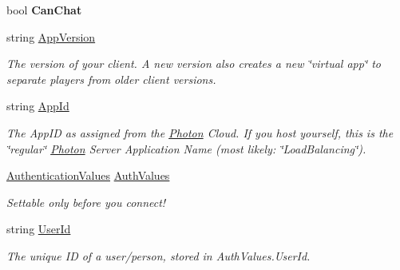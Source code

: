 \begin{DoxyCompactItemize}
\item 
bool {\bfseries Can\+Chat}\hypertarget{class_exit_games_1_1_client_1_1_photon_1_1_chat_1_1_chat_client_a71c10e565150962413bb1abaa89af66a}{}\label{class_exit_games_1_1_client_1_1_photon_1_1_chat_1_1_chat_client_a71c10e565150962413bb1abaa89af66a}

\item 
string \hyperlink{class_exit_games_1_1_client_1_1_photon_1_1_chat_1_1_chat_client_a96bec51384215e8622397b8fe2fc90e1}{App\+Version}
\begin{DoxyCompactList}\small\item\em The version of your client. A new version also creates a new \char`\"{}virtual app\char`\"{} to separate players from older client versions.\end{DoxyCompactList}\item 
string \hyperlink{class_exit_games_1_1_client_1_1_photon_1_1_chat_1_1_chat_client_a876c9a53400fe18fc365775ca728928f}{App\+Id}
\begin{DoxyCompactList}\small\item\em The App\+ID as assigned from the \hyperlink{namespace_exit_games_1_1_client_1_1_photon}{Photon} Cloud. If you host yourself, this is the \char`\"{}regular\char`\"{} \hyperlink{namespace_exit_games_1_1_client_1_1_photon}{Photon} Server Application Name (most likely\+: \char`\"{}\+Load\+Balancing\char`\"{}).\end{DoxyCompactList}\item 
\hyperlink{class_exit_games_1_1_client_1_1_photon_1_1_chat_1_1_authentication_values}{Authentication\+Values} \hyperlink{class_exit_games_1_1_client_1_1_photon_1_1_chat_1_1_chat_client_a5c03b22e8271f95ee0b46ebbd2bac651}{Auth\+Values}
\begin{DoxyCompactList}\small\item\em Settable only before you connect!\end{DoxyCompactList}\item 
string \hyperlink{class_exit_games_1_1_client_1_1_photon_1_1_chat_1_1_chat_client_a8f757bc4e9f4038dc388a8fee3f47150}{User\+Id}
\begin{DoxyCompactList}\small\item\em The unique ID of a user/person, stored in Auth\+Values.\+User\+Id. \end{DoxyCompactList}\item 

\end{DoxyCompactItemize}
